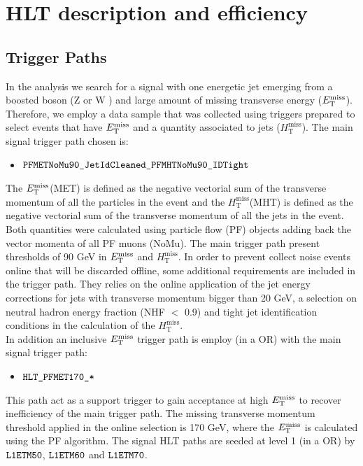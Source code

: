 \chapter{HLT description and efficiency}\label{appendix:ApendiceA}

\section{Trigger Paths}

In the analysis we search for a signal with one energetic jet emerging from a boosted boson (Z or W ) and large amount of missing transverse energy ($E_{\mathrm{T}}^{\text{miss}}$). Therefore,  we employ a data sample that was collected using triggers prepared to select events that have $E_{\mathrm{T}}^{\text{miss}}$ and a quantity associated to jets ($H_{\text{T}}^{\text{miss}}$). The main signal trigger path chosen is:
\begin{itemize}
\item
 $\verb|PFMETNoMu90_JetIdCleaned_PFMHTNoMu90_IDTight|$ 
\end{itemize}
The $E_{\mathrm{T}}^{\text{miss}}$(MET) is defined as the negative vectorial sum of the transverse momentum of all the particles in the event and the $H_{\text{T}}^{\text{miss}}$(MHT) is defined as the negative vectorial sum of the transverse momentum of all the jets in the event. Both quantities were calculated using particle flow (PF) objects adding back the vector momenta of all PF muons (NoMu). The main trigger path present thresholds of 90 GeV in $E_{\mathrm{T}}^{\text{miss}}$ and $H_{\text{T}}^{\text{miss}}$. 
In order to prevent collect noise events online that will be discarded offline, some additional requirements are included in the trigger path. They relies on the online application of the jet energy corrections for jets with transverse momentum bigger than 20 GeV, a selection on neutral hadron energy fraction (NHF $<$ 0.9) and tight jet identification conditions in the calculation of the $H_{\text{T}}^{\text{miss}}$.\\ 
In addition an inclusive $E_{\mathrm{T}}^{\text{miss}}$ trigger path is employ (in a OR) with the main signal trigger path:
\begin{itemize}
\item
 $\verb|HLT_PFMET170_*|$
\end{itemize}
This path act as a support trigger to gain acceptance at high $E_{\mathrm{T}}^{\text{miss}}$ to recover inefficiency of the main trigger path. The missing transverse
momentum threshold applied in the online selection is 170 GeV, where the $E_{\mathrm{T}}^{\text{miss}}$ is calculated  using the PF algorithm.
The signal HLT paths are seeded at level 1 (in a OR) by $\verb|L1ETM50|$, $\verb|L1ETM60|$ and $\verb|L1ETM70|$. 


